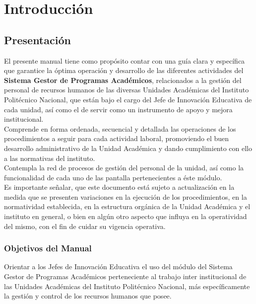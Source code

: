 \chapter{Introducción}
\section{Presentación}
El presente manual tiene como propósito contar con una guía clara y específica que garantice la óptima operación y desarrollo de las diferentes actividades del \textbf{Sistema Gestor de Programas Académicos}, relacionados a la gestión del personal de recursos humanos de las diversas Unidades Académicas del Instituto Politécnico Nacional, que están bajo el cargo del Jefe de Innovación Educativa de cada unidad, así como el de servir como un instrumento de apoyo y mejora institucional.\\
    
Comprende en forma ordenada, secuencial y detallada las operaciones de los procedimientos a seguir para cada actividad laboral, promoviendo el buen desarrollo administrativo de la Unidad Académica y dando cumplimiento con ello a las normativas del instituto.\\
    
Contempla la red de procesos de gestión del personal de la unidad, así como la funcionalidad de cada uno de las pantalla pertenecientes a éste módulo.\\
    
Es importante señalar, que este documento está sujeto a actualización en la medida que se presenten variaciones en la ejecución de los procedimientos, en la normatividad establecida, en la estructura orgánica de la Unidad Académica y el instituto en general, o bien en algún otro aspecto que influya en la operatividad del mismo, con el fin de cuidar su vigencia operativa.\\

    \subsection{Objetivos del Manual}
    Orientar a los Jefes de Innovación Educativa el uso del módulo del Sistema Gestor de Programas Académicos perteneciente al trabajo inter institucional de las Unidades Académicas del Instituto Politécnico Nacional, más específicamente la gestión y control de los recursos humanos que posee.
    
